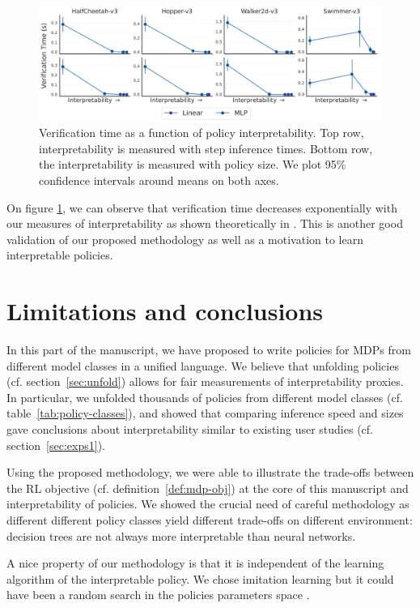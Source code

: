 \begin{figure}[ht]
    \centering
    \includegraphics[width=1\linewidth]{images/images_part3/verification_tradeoff.pdf}
    \caption{Verification time as a function of policy interpretability. Top row, interpretability is measured with step inference times. Bottom row, the interpretability is measured with policy size. We plot 95\% confidence intervals around means on both axes.}
    \label{fig:trade-off-verif}
\end{figure}

On figure \ref{fig:trade-off-verif}, we can observe that verification time decreases exponentially with our measures of interpretability as shown theoretically in \cite{lens-complexity}.
This is another good validation of our proposed methodology as well as a motivation to learn interpretable policies. 

\section{Limitations and conclusions}\label{sec:ccl-imit}
In this part of the manuscript, we have proposed to write policies for MDPs from different model classes in a unified language.
We believe that unfolding policies (cf. section~\ref{sec:unfold}) allows for fair measurements of interpretability proxies.
In particular, we unfolded thousands of policies from different model classes (cf. table~\ref{tab:policy-classes}), and showed that comparing inference speed and sizes gave conclusions about interpretability similar to existing user studies (cf. section~\ref{sec:exps1}).

Using the proposed methodology, we were able to illustrate the trade-offs between the RL objective (cf. definition~\ref{def:mdp-obj}) at the core of this manuscript and interpretability of policies.
We showed the crucial need of careful methodology as different different policy classes yield different trade-offs on different environment: decision trees are not always more interpretable than neural networks. 

A nice property of our methodology is that it is independent of the learning algorithm of the interpretable policy.
We chose imitation learning but it could have been a random search in the policies parameters space \cite{empirical-evidence}.

